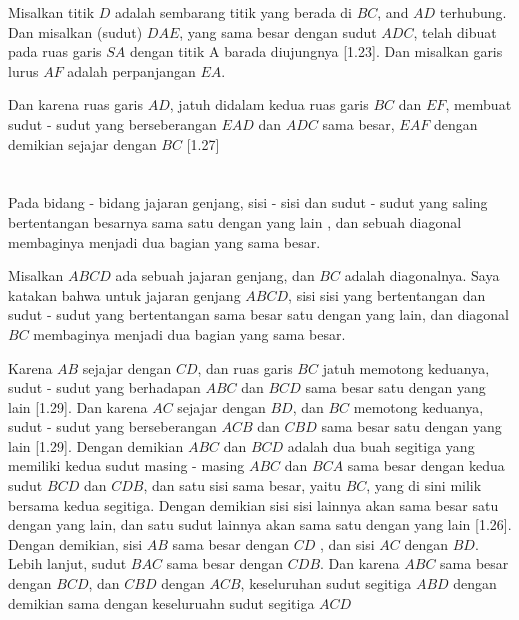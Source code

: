 \documentclass[a4paper, 12pt]{book}
\begin{document}
Misalkan titik $D$ adalah sembarang titik yang berada di $BC$, and $AD$ terhubung. 
Dan misalkan (sudut) $DAE$, yang sama besar dengan sudut $ADC$, telah dibuat 
pada ruas garis $SA$ dengan titik A barada diujungnya [1.23]. Dan misalkan garis
lurus $AF$ adalah perpanjangan $EA$.

Dan karena ruas garis $AD$, jatuh didalam  kedua ruas garis $BC$ dan $EF$, membuat 
sudut - sudut yang berseberangan $EAD$ dan $ADC$ sama besar, $EAF$ dengan demikian
sejajar dengan $BC$ [1.27]


\setcounter{section}{34}
\section*{\centering \thesection}

Pada bidang - bidang jajaran genjang, sisi - sisi dan sudut - sudut yang saling
bertentangan besarnya sama satu dengan yang lain , dan sebuah diagonal membaginya
menjadi dua bagian yang sama besar.


Misalkan $ABCD$ ada sebuah jajaran genjang, dan $BC$ adalah diagonalnya. Saya katakan
bahwa untuk jajaran genjang $ABCD$, sisi sisi yang bertentangan dan sudut - sudut yang bertentangan
sama besar satu dengan yang lain, dan diagonal $BC$ membaginya menjadi dua bagian yang sama besar.

Karena $AB$ sejajar dengan $CD$, dan ruas garis $BC$ jatuh memotong keduanya, sudut - sudut yang 
berhadapan $ABC$ dan $BCD$ sama besar satu dengan yang lain [1.29]. Dan karena $AC$ sejajar dengan
$BD$, dan $BC$ memotong keduanya, sudut - sudut yang berseberangan $ACB$ dan $CBD$ sama besar satu 
dengan yang lain [1.29]. Dengan demikian $ABC$ dan $BCD$ adalah dua buah segitiga yang memiliki
kedua sudut masing - masing $ABC$ dan $BCA$ sama besar dengan kedua sudut $BCD$ dan $CDB$, dan satu 
sisi sama besar, yaitu $BC$, yang di sini milik bersama kedua segitiga.
Dengan demikian sisi sisi lainnya akan sama besar satu dengan yang lain, 
dan satu sudut lainnya akan sama satu dengan yang lain [1.26]. Dengan demikian, sisi $AB$ 
sama besar dengan $CD$ , dan sisi $AC$ dengan $BD$. Lebih lanjut, sudut $BAC$ sama besar
dengan $CDB$. Dan karena $ABC$ sama besar dengan $BCD$, dan $CBD$ dengan $ACB$, keseluruhan
sudut segitiga $ABD$ dengan demikian sama dengan keseluruahn  sudut segitiga $ACD$
\end{document}
